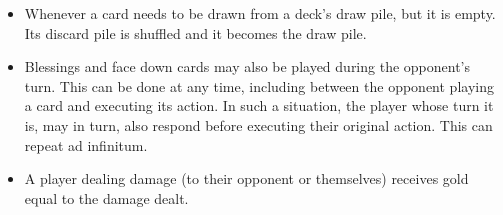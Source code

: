 \documentclass[dvipsnames,parskip,a4paper]{scrartcl}
\begin{document}
\begin{itemize}
\item

Whenever a card needs to be drawn from a deck's draw pile, but it is empty. Its discard pile is shuffled and it becomes the draw pile.

\item

Blessings and face down cards may also be played during the opponent's turn. This can be done at any time, including between the opponent playing a card and executing its action. In such a situation, the player whose turn it is, may in turn, also respond before executing their original action. This can repeat ad infinitum.

\item

A player dealing damage (to their opponent or themselves) receives gold equal to the damage dealt.

\end{itemize}

\newpage
\end{document}
